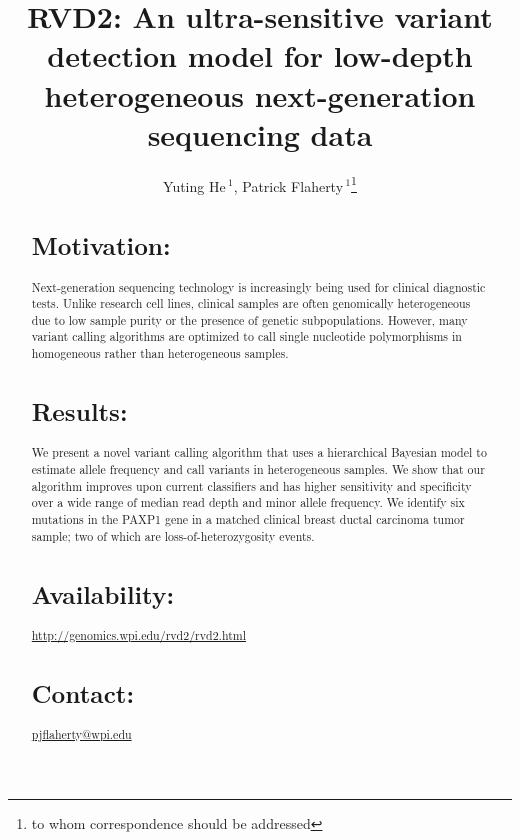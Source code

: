 \documentclass{bioinfo}
\begin{document}

\title[RVD2]{RVD2: An ultra-sensitive variant detection model for low-depth heterogeneous next-generation sequencing data}
\author[He \textit{et~al}]{Yuting He\,$^{1}$, Patrick Flaherty\,$^{1}$\footnote{to whom correspondence should be addressed}}
\address{$^{1}$Department of Biomedical Engineering, Worcester Polytechnic Institute, Worcester, MA, USA}



\maketitle

\begin{abstract}

\section{Motivation:}Next-generation sequencing technology is increasingly being used for clinical diagnostic tests. Unlike research cell lines, clinical samples are often genomically heterogeneous due to low sample purity or the presence of genetic subpopulations. However, many variant calling algorithms are optimized to call single nucleotide polymorphisms in homogeneous rather than heterogeneous samples.

\section{Results:}We present a novel variant calling algorithm that uses a hierarchical Bayesian model to estimate allele frequency and call variants in heterogeneous samples. We show that our algorithm improves upon current classifiers and has higher sensitivity and specificity over a wide range of median read depth and minor allele frequency. We identify six mutations in the PAXP1 gene in a matched clinical breast ductal carcinoma tumor sample; two of which are loss-of-heterozygosity events.

\section{Availability:}
\href{http://genomics.wpi.edu/rvd2/rvd2.html}{http://genomics.wpi.edu/rvd2/rvd2.html}

\section{Contact:} \href{pjflaherty@wpi.edu}{pjflaherty@wpi.edu}
\end{abstract}
\end{document}
